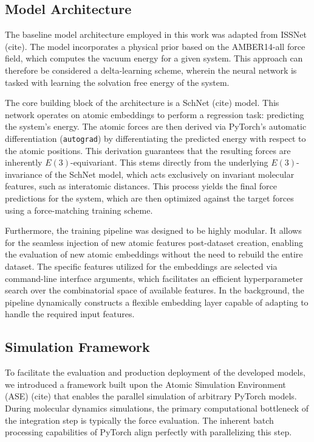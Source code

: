 \subsection{Model Architecture}

The baseline model architecture employed in this work was adapted from ISSNet (cite). The model incorporates a physical prior based on the AMBER14-all force field, which computes the vacuum energy for a given system. This approach can therefore be considered a delta-learning scheme, wherein the neural network is tasked with learning the solvation free energy of the system. 

The core building block of the architecture is a SchNet (cite) model. This network operates on atomic embeddings to perform a regression task: predicting the system's energy. The atomic forces are then derived via PyTorch's automatic differentiation (\texttt{autograd}) by differentiating the predicted energy with respect to the atomic positions. This derivation guarantees that the resulting forces are inherently $E(3)$-equivariant. This stems directly from the underlying $E(3)$-invariance of the SchNet model, which acts exclusively on invariant molecular features, such as interatomic distances. This process yields the final force predictions for the system, which are then optimized against the target forces using a force-matching training scheme.

Furthermore, the training pipeline was designed to be highly modular. It allows for the seamless injection of new atomic features post-dataset creation, enabling the evaluation of new atomic embeddings without the need to rebuild the entire dataset. The specific features utilized for the embeddings are selected via command-line interface arguments, which facilitates an efficient hyperparameter search over the combinatorial space of available features. In the background, the pipeline dynamically constructs a flexible embedding layer capable of adapting to handle the required input features.

\subsection{Simulation Framework}

To facilitate the evaluation and production deployment of the developed models, we introduced a framework built upon the Atomic Simulation Environment (ASE) (cite) that enables the parallel simulation of arbitrary PyTorch models. During molecular dynamics simulations, the primary computational bottleneck of the integration step is typically the force evaluation. The inherent batch processing capabilities of PyTorch align perfectly with parallelizing this step. 

